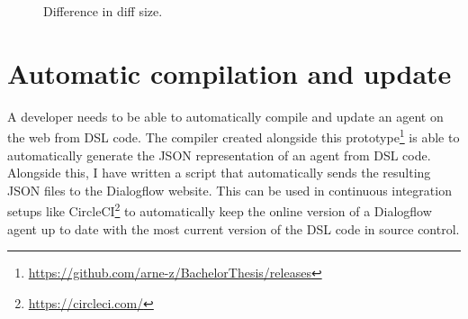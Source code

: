 \begin{figure}
    \centering
    
    \caption{Difference in diff size.}
    \label{DiffChart}
    
\end{figure}

\section{Automatic compilation and update}
A developer needs to be able to automatically compile and update an agent on the web from DSL code.
The compiler created alongside this prototype\footnote{\url{https://github.com/arne-z/BachelorThesis/releases}} is able to automatically generate the JSON representation of an agent from DSL code.
Alongside this, I have written a script that automatically sends the resulting JSON files to the Dialogflow website.
This can be used in continuous integration setups like CircleCI\footnote{\url{https://circleci.com/}} to automatically keep the online version of a Dialogflow agent up to date with the most current version of the DSL code in source control.


